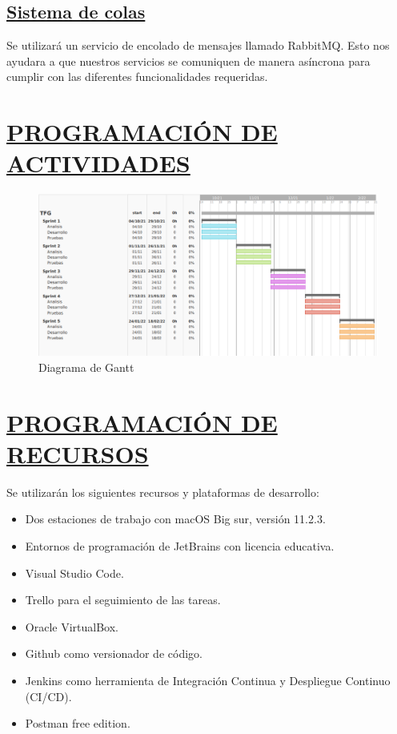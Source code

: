 \subsection*{\underline{Sistema de colas}}
Se utilizará un servicio de encolado de mensajes llamado RabbitMQ. Esto nos ayudara a que nuestros servicios se comuniquen de manera asíncrona para cumplir con las diferentes funcionalidades requeridas.

\section*{\underline{PROGRAMACIÓN DE ACTIVIDADES}}

\begin{figure}[H]
	\centering
	\includegraphics[width=\textwidth]{imagenes/gantt.png} 
	\caption{Diagrama de Gantt}
\end{figure}


\section*{\underline{PROGRAMACIÓN DE RECURSOS}}
Se utilizarán los siguientes recursos y plataformas de desarrollo:
\begin{itemize}
	\item Dos estaciones de trabajo con macOS Big sur, versión 11.2.3.
	\item Entornos de programación de JetBrains con licencia educativa.
	\item Visual Studio Code.
	\item Trello para el seguimiento de las tareas.
	\item Oracle VirtualBox.
	\item Github como versionador de código.
	\item Jenkins como herramienta de Integración Continua y Despliegue Continuo (CI/CD).
	\item Postman free edition.
\end{itemize}

